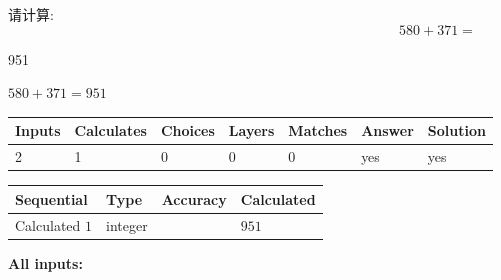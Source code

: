 \documentclass{ctexart}
\begin{document}
  
 
请计算:
\begin{equation}
580 +  %
371 = \nonumber
\end{equation}
 
 
 
\noindent{}
 
 

951
 
 
\noindent{}
 
 

 
 
 
\noindent{}
 
 

$ %
580 +  %
371=   %
951$
 
 
\noindent{}
 
 

 
   
   
   
   
\noindent\begin{tabular}{|l|l|l|l|l|l|l|}
 \hline
Inputs & Calculates & Choices & Layers & Matches & Answer & Solution \\ \hline
 2  & 
 1  & 
 0
  & 
 0  & 
 0  & 
  yes & 
  yes 
  \\ \hline
 \end{tabular}
   
   
   
   
\noindent{}
   
   
  
  
\noindent\begin{tabular}{|l|l|l|l|}
\hline
 Sequential & Type & Accuracy & Calculated \\ 
\hline
 
 
  Calculated $  1 $ & integer &  & 
  $ 951 $ 
 \\  \hline  
 \end{tabular}
   
   
   
   
\noindent\vspace{0.1in}\hspace{-0.08in} {\textbf{\Large{All inputs: }}}
   
\end{document}
